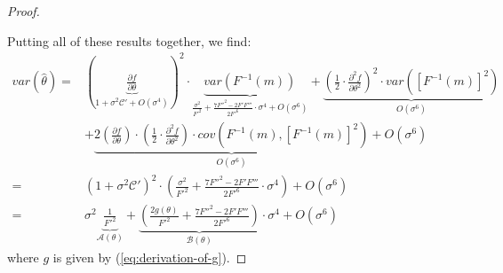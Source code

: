 \begin{proof}
\begin{itemize}
\end{itemize}
Putting all of these results together, we find:
\begin{align*}
var(\widehat{\theta}) 
    =& \left(\underbrace{\frac{\partial f}{\partial \theta}}_{1 + \sigma^2\mathcal{C}' + O(\sigma^4)}\right)^2 \cdot \underbrace{var(F^{-1}(m))}_{\frac{\sigma^2}{F'^2}+\frac{7F''^2-2F'F'''}{2F'^6}\cdot\sigma^4 + O(\sigma^6)} + \underbrace{\left(\frac{1}{2} \cdot \frac{\partial^2 f}{\partial \theta^2}\right)^2 \cdot var\left([F^{-1}(m)]^2\right)}_{O(\sigma^6)}\\
    & + \underbrace{2\left(\frac{\partial f}{\partial \theta}\right) \cdot \left(\frac{1}{2} \cdot \frac{\partial^2 f}{\partial \theta^2}\right) \cdot cov\left(F^{-1}(m), [F^{-1}(m)]^2\right)}_{O(\sigma^6)} + O(\sigma^6) \\
    =& \left(1 + \sigma^2\mathcal{C}'\right)^2 \cdot \left(\frac{\sigma^2}{F'^2}+\frac{7F''^2-2F'F'''}{2F'^6}\cdot\sigma^4\right) + O(\sigma^6) \\
    =& \sigma^2 \underbrace{\frac{1}{F'^2}}_{ \mathcal{A}(\theta)} + \underbrace{\left(\frac{2g(\theta)}{F'^2} + \frac{7F''^2-2F'F'''}{2F'^6}\right)}_{\mathcal{B}(\theta)} \cdot \sigma^4 + O(\sigma^6)
\end{align*}
where $g$ is given by (\ref{eq:derivation-of-g}).

    
\end{proof}




